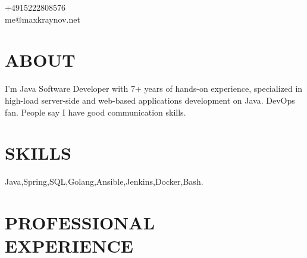 \documentclass[margin,line]{resume}
\begin{document}
\vspace{50mm}
{
	\sc
    \hfill +4915222808576                  \vspace{0mm}\\\vspace{0mm}%
    \hfill me@maxkraynov.net            \vspace{0mm}\\\vspace{-10mm}%
\vspace{1mm}
}


\begin{resume}

\vspace{1mm}

    \section{\mysidestyle \textbf{\large{A}\small{BOUT\\}}}

	I’m Java Software Developer with 7+ years of hands-on experience, specialized in high-load server-side and web-based applications development on Java. DevOps fan. People say I have good communication skills.


\sectionline

    \section{\mysidestyle \textbf{\large{S}\small{KILLS}}}

    Java,\hspace{2mm}Spring,\hspace{2mm}SQL,\hspace{2mm}Golang,\hspace{2mm}Ansible,\hspace{2mm}Jenkins,\hspace{2mm}Docker,\hspace{2mm}Bash.


\sectionline

    \section{\mysidestyle \textbf{\large{P}\small{ROFESSIONAL\\EXPERIENCE}}}


\end{resume}
\end{document}
